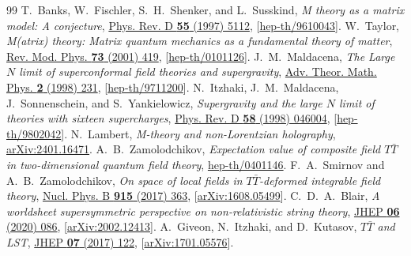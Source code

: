 \documentclass[11pt,a4paper]{article}
\begin{document}
\vspace{-0.5em}
\begin{thebibliography}{99}
 T.~Banks, W.~Fischler, S.~H.~Shenker, and L.~Susskind, \emph{M theory as a matrix model: A conjecture}, \href{https://doi.org/10.1103/PhysRevD.55.5112}{Phys. Rev. D \textbf{55} (1997) 5112}, [\href{https://arxiv.org/abs/hep-th/9610043}{hep-th/9610043}].
 W.~Taylor, \emph{M(atrix) theory: Matrix quantum mechanics as a fundamental theory of matter}, \href{https://doi.org/10.1103/RevModPhys.73.419}{Rev. Mod. Phys. \textbf{73} (2001) 419}, [\href{https://arxiv.org/abs/hep-th/0101126}{hep-th/0101126}].
 J.~M.~Maldacena, \emph{The Large $N$ limit of superconformal field theories and supergravity}, \href{https://doi.org/10.1023/A:1026654312961}{Adv. Theor. Math. Phys. \textbf{2} (1998) 231}, [\href{https://arxiv.org/abs/hep-th/9711200}{hep-th/9711200}].
 N.~Itzhaki, J.~M.~Maldacena, J.~Sonnenschein, and S.~Yankielowicz, \emph{Supergravity and the large $N$ limit of theories with sixteen supercharges}, \href{https://doi.org/10.1103/PhysRevD.58.046004}{Phys. Rev. D \textbf{58} (1998) 046004}, [\href{https://arxiv.org/abs/hep-th/9802042}{hep-th/9802042}].
 N.~Lambert, \emph{M-theory and non-Lorentzian holography}, \href{https://arxiv.org/abs/2401.16471}{arXiv:2401.16471}.
 A.~B.~Zamolodchikov, \emph{Expectation value of composite field $T\bar{T}$ in two-dimensional quantum field theory}, \href{https://arxiv.org/abs/hep-th/0401146}{hep-th/0401146}.
 F.~A.~Smirnov and A.~B.~Zamolodchikov, \emph{On space of local fields in $T\bar{T}$-deformed integrable field theory}, \href{https://doi.org/10.1016/j.nuclphysb.2016.12.014}{Nucl. Phys. B \textbf{915} (2017) 363}, [\href{https://arxiv.org/abs/1608.05499}{arXiv:1608.05499}].
 C.~D.~A.~Blair, \emph{A worldsheet supersymmetric perspective on non-relativistic string theory}, \href{https://doi.org/10.1007/JHEP06(2020)086}{JHEP \textbf{06} (2020) 086}, [\href{https://arxiv.org/abs/2002.12413}{arXiv:2002.12413}].
 A.~Giveon, N.~Itzhaki, and D.~Kutasov, \emph{$T\bar{T}$ and LST}, \href{https://doi.org/10.1007/JHEP07(2017)122}{JHEP \textbf{07} (2017) 122}, [\href{https://arxiv.org/abs/1701.05576}{arXiv:1701.05576}].
\end{thebibliography}
\end{document}

